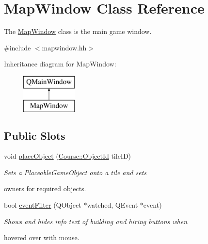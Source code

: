 \hypertarget{classMapWindow}{\section{Map\-Window Class Reference}
\label{classMapWindow}
}


The \hyperlink{classMapWindow}{Map\-Window} class is the main game window.  




{\ttfamily \#include $<$mapwindow.\-hh$>$}

Inheritance diagram for Map\-Window\-:\begin{figure}[H]
\begin{center}
\leavevmode
\includegraphics[height=2.000000cm]{classMapWindow}
\end{center}
\end{figure}
\subsection*{Public Slots}
\begin{DoxyCompactItemize}
\item 
void \hyperlink{classMapWindow_a39948451de86944d283ac9fc972cf271}{place\-Object} (\hyperlink{namespaceCourse_a9a16e743c9813da00109e4991afd2f3e}{Course\-::\-Object\-Id} tile\-I\-D)
\begin{DoxyCompactList}\small\item\em Sets a Placeable\-Game\-Object onto a tile and sets \par
owners for required objects. \end{DoxyCompactList}\item 
bool \hyperlink{classMapWindow_a014ed30c996e95f034a71e3ab66947ef}{event\-Filter} (Q\-Object $\ast$watched, Q\-Event $\ast$event)
\begin{DoxyCompactList}\small\item\em Shows and hides info text of building and hiring buttons when \par
 hovered over with mouse. \end{DoxyCompactList}\end{DoxyCompactItemize}
